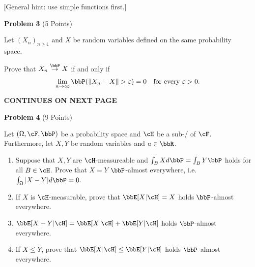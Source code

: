 \documentclass{lecturenotes}
\begin{document}
[General hint: use simple functions first.]


\textbf{Problem 3} (5 Points)

Let $(X_n)_{n \ge 1}$ and $X$ be random variables defined on the same probability space. 

Prove that $X_n \stackrel{\bbP}{\rightarrow} X$ if and only if
\[
	\lim_{n \to \infty} \bbP(\|X_n - X\| > \varepsilon) = 0 \quad \text{for every } \varepsilon > 0.
\]

\textbf{CONTINUES ON NEXT PAGE}

\pagebreak



\textbf{Problem 4} (9 Points)



Let $(\Omega, \cF, \bbP)$ be a probability space and $\cH$ be a sub-\sigalg/ of $\cF$. Furthermore, let $X, Y$ be random variables and $a \in \bbR$. 

\begin{enumerate}[label={(\alph*)}]
\item Suppose that $X, Y$ are $\cH$-measureable and $\int_B X d \bbP = \int_B Y \bbP$ holds for all $B \in \cH$. Prove that $X = Y$ $\bbP$-almost everywhere, i.e. $\int_\Omega |X- Y| d \bbP = 0$.
\item If $X$ is $\cH$-measurable, prove that $\bbE[X | \cH] = X$ holds $\bbP$-almost everywhere.
\item $\bbE[X + Y | \cH] = \bbE[X | \cH] + \bbE[Y | \cH]$ holds $\bbP$-almost everywhere.
\item If $X \le Y$, prove that $\bbE[X | \cH] \le \bbE[Y | \cH]$ holds $\bbP$-almost everywhere.
\end{enumerate}
\end{document}
